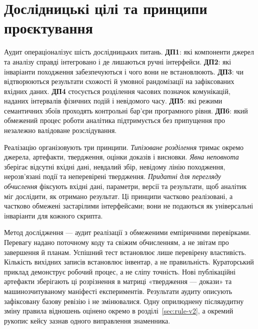 \section{Дослідницькі цілі та принципи проєктування}
Аудит операціоналізує шість дослідницьких питань. \textbf{ДП1}: які компоненти джерел та аналізу справді інтегровано і де лишаються ручні інтерфейси. \textbf{ДП2}: які інваріанти походження забезпечуються і чого вони не встановлюють. \textbf{ДП3}: чи відтворюються результати схожості й умовної рандомізації на зафіксованих вхідних даних. \textbf{ДП4} стосується розділення часових позначок комунікацій, наданих інтервалів фізичних подій і невідомого часу. \textbf{ДП5}: які режими семантичних збоїв проходять контрольні бар'єри програмного рівня. \textbf{ДП6}: який обмежений процес роботи аналітика підтримується без припущення про незалежно валідоване розслідування.

Реалізацію організовують три принципи. \emph{Типізоване розділення} тримає окремо джерела, артефакти, твердження, оцінки доказів і висновки. \emph{Явна неповнота} зберігає відсутні вхідні дані, невдалий збір, невідому лінію походження, нерозв'язані події та неперевірені твердження. \emph{Придатні для перегляду обчислення} фіксують вхідні дані, параметри, версії та результати, щоб аналітик міг дослідити, як отримано результат. Ці принципи частково реалізовані, а частково обмежені застарілими інтерфейсами; вони не подаються як універсальні інваріанти для кожного скрипта.

Метод дослідження --- аудит реалізації з обмеженими емпіричними перевірками. Перевагу надано поточному коду та свіжим обчисленням, а не звітам про завершення й планам. Успішний тест встановлює лише перевірену властивість. Кількість вихідних записів встановлює інвентар, а не правильність. Кураторський приклад демонструє робочий процес, а не сліпу точність. Нові публікаційні артефакти зберігають ці розрізнення в матриці «твердження --- докази» та машинозчитуваному маніфесті експериментів. Результати аудиту описують зафіксовану базову ревізію і не змінювалися. Одну оприлюднену післяаудитну зміну правила відношень оцінено окремо в розділі~\ref{sec:rule-v2}, а окремий рукопис кейсу зазнав одного виправлення знаменника.
